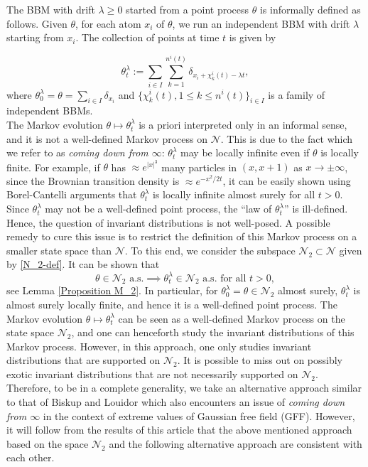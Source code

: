 \documentclass[a4paper,reqno]{amsart}%
\newcommand{\1}{\mathbf 1}
\theoremstyle{mine}
\numberwithin{theorem}{section}
\numberwithin{equation}{section}
\theoremstyle{remark}
\begin{document}
 The BBM with drift $\lambda \geq 0 $ started from a point process $\theta$ is informally defined as follows. Given $\theta$, for each atom $x_i$ of $\theta$, we run an independent BBM with drift $\lambda$ starting from $x_i$. The collection of points at time $t$ is given by  

 \begin{equation} \label{theta_t-def}
        \theta_t^\lambda:= \sum\limits_{i \in I} \sum\limits_{k=1}^{n^i(t)} \delta_{x_i+\chi_k^i(t)-\lambda t},
    \end{equation}
where $\theta_0^\lambda = \theta=\sum \limits_{i \in I} \delta_{x_i}$ and $\{\chi_k^i(t), 1 \le k \le n^i(t)\}_{i \in I}$ is a family of independent BBMs.  \\

The Markov evolution $\theta \mapsto \theta_t^\lambda$ is a priori interpreted only in an informal sense, and it is not a well-defined Markov process on $\mathcal{N}$. This is due to the fact which we refer to as \textit{coming down from $\infty$}: $\theta_t^\lambda$ may be locally infinite even if $\theta$ is locally finite. For example, if $\theta$ has $\approx e^{|x|^3}$ many particles in $(x,x+1)$ as $x\to \pm \infty$, since the Brownian transition density is $\approx e^{-x^2/2t}$, it can be easily shown using Borel-Cantelli arguments that $\theta_t^\lambda$ is locally infinite almost surely for all $t>0$. Since $\theta_t^\lambda$ may not be a well-defined point process, the ``law of $\theta_t^\lambda$'' is ill-defined. Hence, the question of invariant distributions is not well-posed. A possible remedy to cure this issue is to restrict the definition of this Markov process on a smaller state space than $\mathcal{N}$. To this end, we consider the subspace $\mathcal{N}_2 \subset \mathcal{N}$ given by \eqref{N_2-def}. It can be shown that
\begin{equation}\label{N_2-is-fixed}
    \theta \in \mathcal{N}_2 \textrm{ a.s.}  \implies \theta_t^\lambda \in \mathcal{N}_2 \textrm{ a.s. for all $t>0$},
\end{equation} 
see Lemma \ref{Proposition M_2}. In particular, for $\theta_0^\lambda = \theta \in \mathcal{N}_2$ almost surely, $\theta_t^\lambda$ is almost surely locally finite, and hence it is a well-defined point process. The Markov evolution $\theta \mapsto \theta_t^\lambda$ can be seen as a well-defined Markov process on the state space $\mathcal{N}_2$, and one can henceforth study the invariant distributions of this Markov process. However, in this approach, one only studies invariant distributions that are supported on $\mathcal{N}_2$. It is possible to miss out on possibly exotic invariant distributions that are not necessarily supported on $\mathcal{N}_2$. Therefore, to be in a complete generality, we take an alternative approach similar to that of Biskup and Louidor \cite{Biskup-Louidor-GFF-local-extreme} which also encounters an issue of \textit{coming down from $\infty$} in the context of extreme values of Gaussian free field (GFF). However, it will follow from the results of this article that the above mentioned approach based on the space $\mathcal{N}_2$ and the following alternative approach are consistent with each other. \\ 
\end{document}
